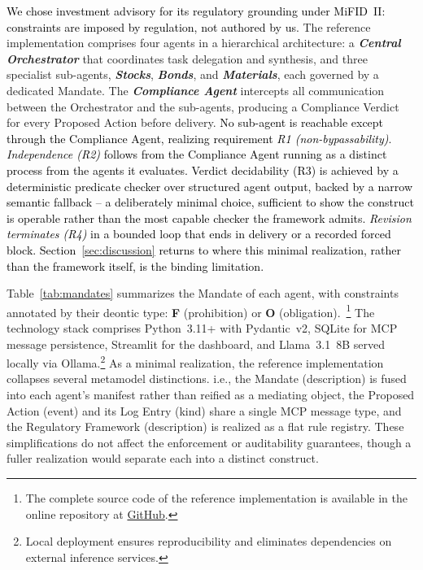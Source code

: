 \documentclass[runningheads]{llncs}
\begin{document}
\textcolor{black}{We chose investment advisory for its regulatory grounding under MiFID~II: constraints are imposed by regulation, not authored by us.} The reference implementation comprises four agents in a hierarchical architecture:
a \textbf{\textit{Central Orchestrator}} that coordinates task delegation and synthesis, and three specialist sub-agents, \textbf{\textit{Stocks}}, \textbf{\textit{Bonds}}, and \textbf{\textit{Materials}}, each governed by a dedicated Mandate. The \textbf{\textit{Compliance Agent}} intercepts all communication between the Orchestrator and the sub-agents, producing a Compliance Verdict for every Proposed Action before delivery. \textcolor{black}{No sub-agent is reachable except through the Compliance Agent, realizing requirement \textit{R1 (non-bypassability)}. \textit{Independence (R2)} follows from the Compliance Agent running as a distinct process from the agents it evaluates. Verdict decidability (R3) is achieved by a deterministic predicate checker over structured agent output, backed by a narrow semantic fallback -- a deliberately minimal choice, sufficient to show the construct is operable rather than the most capable checker the framework admits. \textit{Revision terminates (R4)} in a bounded loop that ends in delivery or a recorded forced block.
Section~\ref{sec:discussion} returns to where this minimal realization, rather than the framework itself, is the binding limitation.} 

Table~\ref{tab:mandates} summarizes the Mandate of each agent, with constraints annotated by their deontic type: \textbf{F} (prohibition) or \textbf{O} (obligation).~\footnote{\label{fn:materials}The complete source code of the reference implementation is available in the online repository at \href{https://github.com/InformationServiceSystems/ai-intent}{GitHub}.}
The technology stack comprises Python~3.11+ with Pydantic~v2, SQLite
for MCP message persistence, Streamlit for the dashboard, and
Llama~3.1~8B served locally via Ollama.\footnote{Local deployment
ensures reproducibility and eliminates dependencies on external
inference services.}
As a minimal realization, the reference implementation collapses several metamodel distinctions. i.e., the Mandate (\guillemotleft description\guillemotright) is fused into each agent's manifest rather than reified as a mediating object, the Proposed Action (\guillemotleft event\guillemotright) and its Log Entry (\guillemotleft kind\guillemotright) share a single MCP message type, and the Regulatory Framework (\guillemotleft description\guillemotright) is realized as a flat rule registry. These simplifications do not affect the enforcement or auditability guarantees, though a fuller realization would separate each into a distinct construct.
\end{document}
